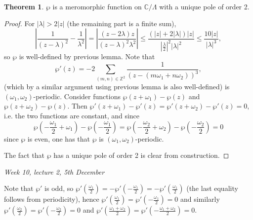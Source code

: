 \documentclass{article}
\newcommand{\Z}{\mathbb{Z}}
\newcommand{\C}{\mathbb{C}}
\theoremstyle{definition}
\newtheorem{thm}[defn]{Theorem}
\begin{document}
\begin{thm}
$\wp$ is a meromorphic function on $\C/\Lambda$ with a unique pole of order 2.
\end{thm}
\begin{proof}
For $|\lambda|>2|z|$ (the remaining part is a finite sum),
\[
\left|\frac{1}{(z-\lambda)^2}-\frac{1}{\lambda^2}\right|=\left|\frac{(z-2\lambda)z}{(z-\lambda)^2\lambda^2}\right|\leq\frac{(|z|+2|\lambda|)|z|}{\left|\frac{\lambda}{2}\right|^2|\lambda|^2}\leq \frac{10|z|}{|\lambda|^3},
\]
so $\wp$ is well-defined by previous lemma. Note that
\[
\wp'(z)=-2\sum_{(m,n)\in\Z^2}\frac{1}{(z-(m\omega_1+n\omega_2))^3},
\]
(which by a similar argument using previous lemma is also well-defined) is $(\omega_1,\omega_2)$-periodic. Consider functions $\wp(z+\omega_1)-\wp(z)$ and $\wp(z+\omega_2)-\wp(z)$. Then $\wp'(z+\omega_1)-\wp'(z)=\wp'(z+\omega_2)-\wp'(z)=0$, i.e. the two functions are constant, and since
\[
\wp\left(-\frac{\omega_1}{2}+\omega_1\right)-\wp\left(-\frac{\omega_1}{2}\right)=\wp\left(-\frac{\omega_2}{2}+\omega_2\right)-\wp\left(-\frac{\omega_2}{2}\right)=0
\]
since $\wp$ is even, one has that $\wp$ is $(\omega_1,\omega_2)$-periodic.

The fact that $\wp$ has a unique pole of order 2 is clear from construction.
\end{proof}

\begin{flushright}
\textit{Week 10, lecture 2, 5th December}
\end{flushright}

Note that $\wp'$ is odd, so $\wp'\left(\frac{\omega_1}{2}\right)=-\wp'\left(-\frac{\omega_1}{2}\right)=-\wp'\left(\frac{\omega_1}{2}\right)$ (the last equality follows from periodicity), hence $\wp'\left(\frac{\omega_1}{2}\right)=\wp'\left(-\frac{\omega_1}{2}\right)=0$ and similarly $\wp'\left(\frac{\omega_2}{2}\right)=\wp'\left(-\frac{\omega_2}{2}\right)=0$ and $\wp'\left(\frac{\omega_1+\omega_2}{2}\right)=\wp'\left(-\frac{\omega_1+\omega_2}{2}\right)=0$.
\end{document}
